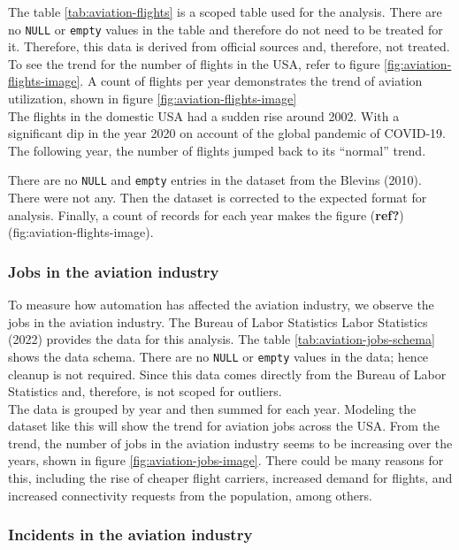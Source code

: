 \documentclass[
  man,floatsintext]{apa7}
\begin{document}
The table \ref{tab:aviation-flights} is a scoped table used for the analysis. There are no \texttt{NULL} or \texttt{empty} values in the table and therefore do not need to be treated for it. Therefore, this data is derived from official sources and, therefore, not treated. To see the trend for the number of flights in the USA, refer to figure \ref{fig:aviation-flights-image}. A count of flights per year demonstrates the trend of aviation utilization, shown in figure \ref{fig:aviation-flights-image}\\

The flights in the domestic USA had a sudden rise around 2002. With a significant dip in the year 2020 on account of the global pandemic of COVID-19. The following year, the number of flights jumped back to its ``normal'' trend.

There are no \texttt{NULL} and \texttt{empty} entries in the dataset from the Blevins (2010). There were not any. Then the dataset is corrected to the expected format for analysis. Finally, a count of records for each year makes the figure (\textbf{ref?})(fig:aviation-flights-image).

\hypertarget{jobs-in-the-aviation-industry}{%
\subsubsection{Jobs in the aviation industry}\label{jobs-in-the-aviation-industry}}

To measure how automation has affected the aviation industry, we observe the jobs in the aviation industry. The Bureau of Labor Statistics Labor Statistics (2022) provides the data for this analysis. The table \ref{tab:aviation-jobs-schema} shows the data schema. There are no \texttt{NULL} or \texttt{empty} values in the data; hence cleanup is not required. Since this data comes directly from the Bureau of Labor Statistics and, therefore, is not scoped for outliers.\\

The data is grouped by year and then summed for each year. Modeling the dataset like this will show the trend for aviation jobs across the USA. From the trend, the number of jobs in the aviation industry seems to be increasing over the years, shown in figure \ref{fig:aviation-jobs-image}. There could be many reasons for this, including the rise of cheaper flight carriers, increased demand for flights, and increased connectivity requests from the population, among others.

\hypertarget{incidents-in-the-aviation-industry}{%
\subsubsection{Incidents in the aviation industry}\label{incidents-in-the-aviation-industry}}
\end{document}

